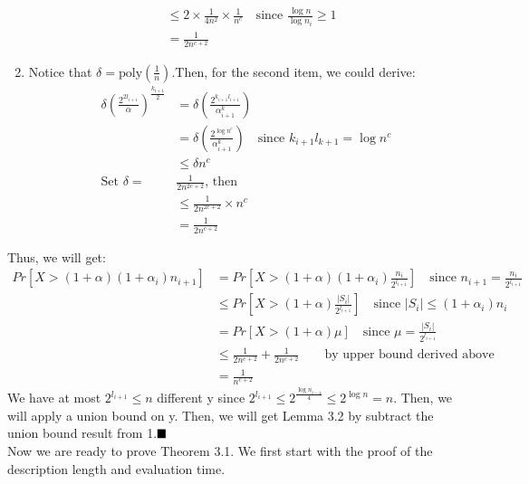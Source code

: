 \documentclass[a4paper, english]{paper}
\begin{document}
\begin{enumerate}
\begin{align*}
		& \le 2\times\frac1{4n^2}\times\frac1{n^c}\quad\text{since } \frac{\log n}{\log n_i} \ge 1\\
		& = \frac1{2n^{c+2}}
		\end{align*}
	\item Notice that $\delta=\text{poly}(\frac1n)$.Then, for the second item, we could derive:
		\begin{align*}
		\delta\left( \frac{2^{2l_{i+1}}}{\alpha}\right)^{\frac{k_{i+1}}2} &= \delta\left( \frac{2^{k_{i+1}l_{i+1}}}{\alpha^k_{i+1}}\right)\\
		& =  \delta\left( \frac{2^{\log n^c}}{\alpha^k_{i+1}}\right)\quad\text{since }k_{i+1}l_{k+1} = \log n^c\\
		& \le \delta n^c\\
		\text{Set }\delta = &\frac1{2n^{2c+2}}\text{, then}\\
		& \le \frac1{2n^{2c+2}}\times n^c\\
		& = \frac1{2n^{c+2}}
		\end{align*}
	\end{enumerate}
	Thus, we will get:
	\begin{align*}
	Pr\left[X>(1+\alpha)(1+\alpha_i)n_{i+1}\right] &= Pr\left[X>(1+\alpha)(1+\alpha_i)\frac{n_i}{2^{l_{i+1}}}\right]\quad\text{since }n_{i+1} = \frac{n_i}{2^{l_{i+1}}}\\
	& \le Pr\left[X>(1+\alpha)\frac{|S_i|}{2^{l_{i+1}}}\right]\quad\text{since }|S_i|\le(1+\alpha_i)n_i\\
	& = Pr \left[X>(1+\alpha)\mu\right]\quad\text{since }\mu = \frac{|S_i|}{2^{l_{i+1}}}\\
	& \le \frac1{2n^{c+2}}+\frac1{2n^{c+2}}\qquad \text{by upper bound derived above}\\ 
	& = \frac1{n^{c+2}}
	\end{align*}
	We have at most $2^{l_{i+1}}\le n$ different y since $2^{l_{i+1}}\le2^{\frac{\log n_{i-1}}4}\le 2^{\log n}=n$. Then, we will apply a union bound on y. Then, we will get Lemma 3.2 by subtract the union bound result from 1.$\hfill\blacksquare$ \\

	\noindent Now we are ready to prove Theorem 3.1. We first start with the proof of the description length and evaluation time.\\
	
\end{document}
